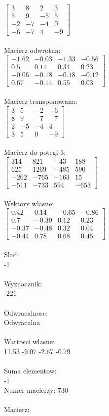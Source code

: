 \documentclass[a4paper,12pt]{article}
\begin{document}
$\begin{bmatrix} 3&8&2&3\\5&9&-5&5\\-2&-7&-4&0\\-6&-7&4&-9 \end{bmatrix}$
\\
\\
Macierz odwrotna:\\

$\begin{bmatrix} -1.62&-0.03&-1.33&-0.56\\0.5&0.11&0.34&0.23\\-0.06&-0.18&-0.18&-0.12\\0.67&-0.14&0.55&0.03 \end{bmatrix}$
\\
\\
Macierz transponowana:\\

$\begin{bmatrix} 3&5&-2&-6\\8&9&-7&-7\\2&-5&-4&4\\3&5&0&-9 \end{bmatrix}$
\\
\\
Macierz do potegi 3:\\

$\begin{bmatrix} 314&821&-43&188\\625&1269&-485&590\\-202&-765&-163&15\\-511&-733&594&-653 \end{bmatrix}$
\\
\\
Wektory wlasne:\\

$\begin{bmatrix} 0.42&0.14&-0.65&-0.86\\0.7&-0.39&0.12&0.23\\-0.37&-0.48&0.32&0.04\\-0.44&0.78&0.68&0.45 \end{bmatrix}$
\\
\\
Slad:\\
-1
\\
\\
Wyznacznik:\\
-221
\\
\\
Odwracalnosc:\\
Odwracalna
\\
\\
Wartosci wlasne:\\
11.53 -9.07 -2.67 -0.79
\\
\\
Suma elementow:\\
-1
\\
\newpage
Numer macierzy:
730
\\
\\
Macierz:\\
\end{document}
